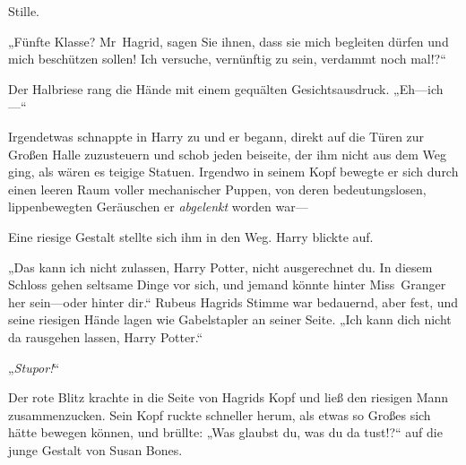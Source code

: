 Stille.

„Fünfte Klasse? Mr~Hagrid, sagen Sie ihnen, dass sie mich begleiten dürfen und mich beschützen sollen! Ich versuche, vernünftig zu sein, verdammt noch mal!?“

Der Halbriese rang die Hände mit einem gequälten Gesichtsausdruck. „Eh—ich—“

Irgendetwas schnappte in Harry zu und er begann, direkt auf die Türen zur Großen Halle zuzusteuern und schob jeden beiseite, der ihm nicht aus dem Weg ging, als wären es teigige Statuen. Irgendwo in seinem Kopf bewegte er sich durch einen leeren Raum voller mechanischer Puppen, von deren bedeutungslosen, lippenbewegten Geräuschen er \emph{abgelenkt} worden war—


Eine riesige Gestalt stellte sich ihm in den Weg. Harry blickte auf.

„Das kann ich nicht zulassen, Harry Potter, nicht ausgerechnet du. In diesem Schloss gehen seltsame Dinge vor sich, und jemand könnte hinter Miss~Granger her sein—oder hinter dir.“
Rubeus Hagrids Stimme war bedauernd, aber fest, und seine riesigen Hände lagen wie Gabelstapler an seiner Seite. „Ich kann dich nicht da rausgehen lassen, Harry Potter.“

„\emph{Stupor!}“

Der rote Blitz krachte in die Seite von Hagrids Kopf und ließ den riesigen Mann zusammenzucken. Sein Kopf ruckte schneller herum, als etwas so Großes sich hätte bewegen können, und brüllte: „Was glaubst du, was du da tust!?“ auf die junge Gestalt von Susan Bones.

